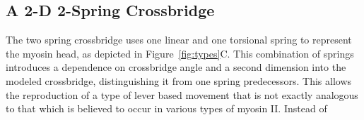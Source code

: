 \documentclass[]{article}
\begin{document}
% 
%  
% 
%  

\subsection*{A 2-D 2-Spring Crossbridge}


The two spring crossbridge uses one linear and one torsional spring to represent the myosin head, as depicted in Figure~\ref{fig:types}C.
This combination of springs introduces a dependence on crossbridge angle and a second dimension into the modeled crossbridge, distinguishing it from one spring predecessors.
This allows the reproduction of a type of lever based movement that is not exactly analogous to that which is believed to occur in various types of myosin II. \citet{Someone20xx, SomeoneElse19xx} Instead of
\end{document}
